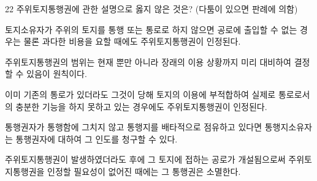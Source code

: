 \begin{question}{22}
주위토지통행권에 관한 설명으로 옳지 않은 것은? (다툼이 있으면 판례에 의함)
\begin{choices}
  \item 토지소유자가 주위의 토지를 통행 또는 통로로 하지 않으면 공로에 출입할 수 없는 경우는 물론 과다한 비용을 요할 때에도 주위토지통행권이 인정된다.
  \item 주위토지통행권의 범위는 현재 뿐만 아니라 장래의 이용 상황까지 미리 대비하여 결정할 수 있음이 원칙이다.
  \item 이미 기존의 통로가 있더라도 그것이 당해 토지의 이용에 부적합하여 실제로 통로로서의 충분한 기능을 하지 못하고 있는 경우에도 주위토지통행권이 인정된다.
  \item 통행권자가 통행함에 그치지 않고 통행지를 배타적으로 점유하고 있다면 통행지소유자는 통행권자에 대하여 그 인도를 청구할 수 있다.
  \item 주위토지통행권이 발생하였더라도 후에 그 토지에 접하는 공로가 개설됨으로써 주위토지통행권을 인정할 필요성이 없어진 때에는 그 통행권은 소멸한다.
\end{choices}
\end{question}

